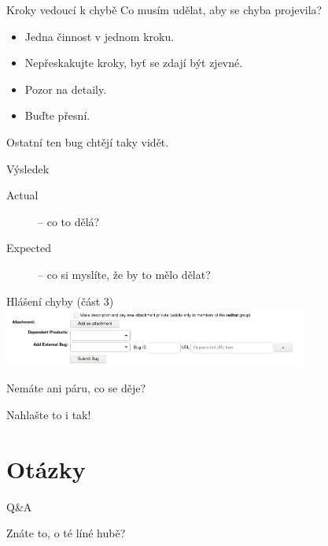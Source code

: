 \documentclass[12pt,aspectratio=169]{beamer}
\begin{document}
\begin{frame}{Kroky vedoucí k chybě}
Co musím udělat, aby se chyba projevila?
\begin{itemize}
	\item Jedna činnost v jednom kroku.
	\item Nepřeskakujte kroky, byť se zdají být zjevné.
	\item Pozor na detaily.
	\item Buďte přesní.
\end{itemize}
Ostatní ten bug chtějí taky vidět.
\end{frame}

\begin{frame}{Výsledek}
\begin{description}
	\item[Actual] -- co to dělá?
	\item[Expected] -- co si myslíte, že by to mělo dělat?
\end{description}
\end{frame}

\begin{frame}{Hlášení chyby (část 3)}
\includegraphics[width=10cm]{images/bz_footer.png}
\end{frame}

\begin{frame}{Nemáte ani páru, co se děje?}

{\Large Nahlašte to i tak!}
\end{frame}

\section{Otázky}

\begin{frame}{Q\&A}

{\Large Znáte to, o té líné hubě?}
\end{frame}
\end{document}
